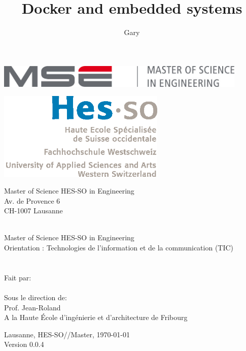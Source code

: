 \documentclass[11pt,a4paper,oneside]{report}
\title{Docker and embedded systems}
\author{Gary \bsc{Marigliano}}
\newcommand{\school}{Haute École d'ingénierie et d'architecture de Fribourg}
\newcommand{\version}{0.0.4}
\begin{document}
\begin{titlepage}
\selectfont
\begin{flushright}
\begin{minipage}{0.5\textwidth}
\begin{flushleft}
\includegraphics[width=0.9\textwidth]{./img/mse_logo}
\end{flushleft}
\end{minipage}%
\begin{minipage}{0.5\textwidth}
\begin{flushright}
\includegraphics[width=0.6\textwidth]{./img/logo_hes-so}
\end{flushright}
\end{minipage}
\begin{flushleft}
\footnotesize
Master of Science HES-SO in Engineering \\
Av. de Provence 6 \\
CH-1007 Lausanne
\end{flushleft}
~\\[0.5cm]

\Huge Master of Science HES-SO in Engineering\\[0.5cm]

\LARGE Orientation : Technologies de l’information et de la communication (TIC)\\[0.5cm]
~\\[1cm]
{
\Huge \MakeUppercase{\thetitle} \\[2.5cm]
}
{
\normalsize
Fait par:\\
\Huge \theauthor \\[0.5cm]
}
{
\normalsize
Sous le direction de: \\
Prof. Jean-Roland  \\
A la \school
}
\vfill

{\normalsize Lausanne, HES-SO//Master, \today \\
Version \version}

\end{flushright}
\end{titlepage}
\end{document}
